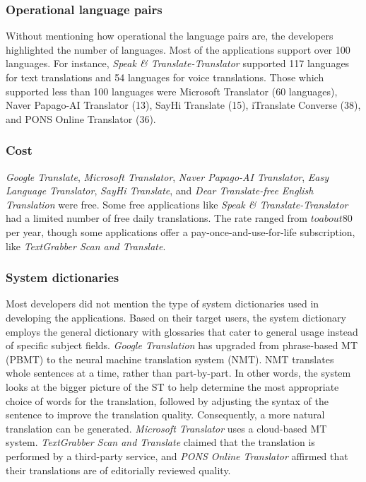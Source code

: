 \documentclass[english]{textolivre}
\begin{document}
\subsubsection{Operational language pairs}\label{sec-codigos}
Without mentioning how operational the language pairs are, the developers highlighted the number of languages. Most of the applications support over 100 languages. For instance, \textit{Speak \& Translate-Translator} supported 117 languages for text translations and 54 languages for voice translations. Those which supported less than 100 languages were Microsoft Translator (60 languages), Naver Papago-AI Translator (13), SayHi Translate (15), iTranslate Converse (38), and PONS Online Translator (36).


\subsubsection{Cost}\label{sec-contributors-expl}
\textit{Google Translate}, \textit{Microsoft Translator}, \textit{Naver Papago-AI Translator}, \textit{Easy Language Translator}, \textit{SayHi Translate}, and \textit{Dear Translate-free English Translation} were free. Some free applications like \textit{Speak \& Translate-Translator} had a limited number of free daily translations. The rate ranged from $ to about $80 per year, though some applications offer a pay-once-and-use-for-life subscription, like \textit{TextGrabber Scan and Translate}.

\subsubsection{System dictionaries}\label{sec-contributors-expl}
Most developers did not mention the type of system dictionaries used in developing the applications. Based on their target users, the system dictionary employs the general dictionary with glossaries that cater to general usage instead of specific subject fields. \textit{Google Translation} has upgraded from phrase-based MT (PBMT) to the neural machine translation system (NMT). NMT translates whole sentences at a time, rather than part-by-part. In other words, the system looks at the bigger picture of the ST to help determine the most appropriate choice of words for the translation, followed by adjusting the syntax of the sentence to improve the translation quality. Consequently, a more natural translation can be generated. \textit{Microsoft Translator} uses a cloud-based MT system. \textit{TextGrabber Scan and Translate} claimed that the translation is performed by a third-party service, and \textit{PONS Online Translator} affirmed that their translations are of editorially reviewed quality.
\end{document}
